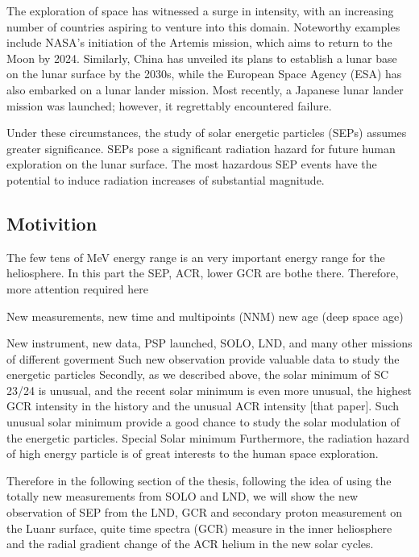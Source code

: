 The exploration of space has witnessed a surge in intensity, with an increasing number of countries aspiring to venture into this domain. Noteworthy examples include NASA's initiation of the Artemis mission, which aims to return to the Moon by 2024. Similarly, China has unveiled its plans to establish a lunar base on the lunar surface by the 2030s, while the European Space Agency (ESA) has also embarked on a lunar lander mission. Most recently, a Japanese lunar lander mission was launched; however, it regrettably encountered failure.

Under these circumstances, the study of solar energetic particles (SEPs) assumes greater significance. SEPs pose a significant radiation hazard for future human exploration on the lunar surface. The most hazardous SEP events have the potential to induce radiation increases of substantial magnitude.

\subsection{Motivition}

The few tens of MeV energy range is an very important energy range for the heliosphere. In this part the SEP, ACR, lower GCR are bothe there. Therefore, more attention required here

New measurements, new time and multipoints (NNM)
new age (deep space age)

New instrument, new data, PSP launched, SOLO, LND, and many other missions of different goverment
Such new observation provide valuable data to study the energetic particles
Secondly, as we described above, the solar minimum of SC 23/24 is unusual, and the recent solar minimum is even more unusual, the highest GCR intensity in the history and the unusual ACR intensity [that paper]. Such unusual solar minimum provide a good chance to study the solar modulation of the energetic particles. Special Solar minimum
Furthermore, the radiation hazard of high energy particle is of great interests to the human space exploration. 


Therefore in the following section of the thesis, following the idea of using the totally new measurements from SOLO and LND, we will show the new observation of SEP from the LND, GCR and secondary proton measurement on the Luanr surface, quite time spectra (GCR) measure in the inner heliosphere and the radial gradient change of the ACR helium in the new solar cycles.
